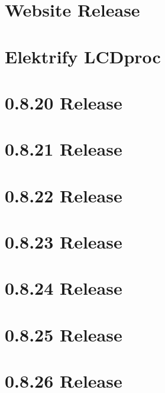 \let\mypdfximage\pdfximage\def\pdfximage{\immediate\mypdfximage}\documentclass[twoside]{book}
\newcommand{\+}{\discretionary{\mbox{\scriptsize$\hookleftarrow$}}{}{}}
\begin{document}
\chapter{Website Release}
\label{doc_news_2016-12-17_website_release_md}

\chapter{Elektrify LCDproc}
\label{doc_news_2017-03-18_lcdproc_md}

\chapter{0.8.20 Release}
\label{doc_news_2017-10-31_0_8_20_md}

\chapter{0.8.21 Release}
\label{doc_news_2017-12-22_0_8_21_md}

\chapter{0.8.22 Release}
\label{doc_news_2018-03-27_0_8_22_md}

\chapter{0.8.23 Release}
\label{doc_news_2018-05-13_0_8_23_md}

\chapter{0.8.24 Release}
\label{doc_news_2018-08-18_0_8_24_md}

\chapter{0.8.25 Release}
\label{doc_news_2018-11-18_0_8_25_md}

\chapter{0.8.26 Release}
\label{doc_news_2019-02-26_0_8_26_md}

\end{document}
